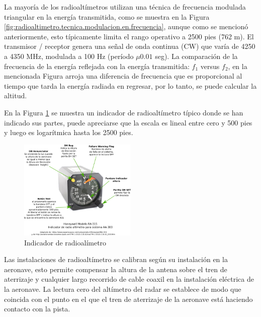 La mayoría de los radioalt\'imetros utilizan una técnica de frecuencia modulada triangular en la energía transmitida, como se muestra en la Figura \ref{fig:radioaltimetro.tecnica.modulacion.en.frecuencia}, aunque como se mencionó anteriormente, esto típicamente limita el rango operativo a 2500 pies (762 m). El transmisor / receptor genera una señal de onda continua (CW) que varía de 4250 a 4350 MHz, modulada a 100 Hz (período $\mu 0.01$ seg). La comparación de la frecuencia de la energía reflejada con la energía transmitida: $f_1$ versus $f_2$, en la mencionada Figura  arroja una diferencia de frecuencia que es proporcional al tiempo que tarda la energía radiada en regresar, por lo tanto, se puede calcular la altitud.


En la Figura \ref{fig:radioaltimetro.indicador} 
se muestra un indicador de radioalt\'imetro t\'ipico donde se han indicado sus partes, puede apreciarse que la escala es lineal entre cero y 500 pies y luego es logar\'itmica hasta los 2500 pies.

\begin{figure}[!htb]
  \centering
  \includegraphics[width=0.5\textwidth]{06.radionavegacion/Imagenes/06.05.radar/06_radar_0004.png}
  \caption{Indicador de radioal\'imetro}
  \label{fig:radioaltimetro.indicador}
\end{figure}


Las instalaciones de radioalt\'imetro se calibran seg\'un su instalación en la aeronave, esto permite compensar la altura de la antena sobre el tren de aterrizaje y cualquier largo recorrido de cable coaxil en la instalación eléctrica de la aeronave. 
La lectura cero del altímetro del radar se establece de modo que coincida con el punto en el que el tren de aterrizaje de la aeronave está haciendo contacto con la pista. 


